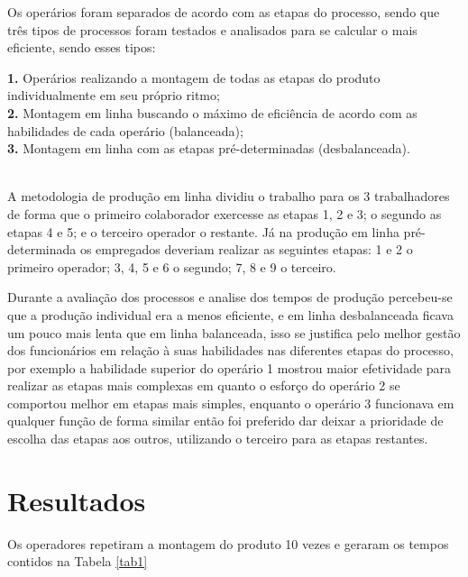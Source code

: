 \documentclass[
	12pt,				%
	oneside,			%
	a4paper,			%
	english,			%
	french,				%
	spanish,			%
	brazil,				%
	]{abntex2}
\begin{document}
Os operários foram separados de acordo com as etapas do processo, sendo que três tipos de processos foram testados e analisados para se calcular o mais eficiente, sendo esses tipos: \\


\begin{minipage}{13cm}
\begin{center}
\textbf{1.} Operários realizando a montagem de todas as etapas do produto individualmente em seu próprio ritmo;\\ 
\textbf{2.} Montagem em linha buscando o máximo de eficiência de acordo com as habilidades de cada operário (balanceada); \\
\textbf{3.} Montagem em linha com as etapas pré-determinadas (desbalanceada).
\end{center}
\end{minipage}\\

A metodologia de produção em linha dividiu o trabalho para os 3 trabalhadores de forma que o primeiro colaborador exercesse as etapas 1, 2 e 3; o segundo as etapas 4 e 5; e o terceiro operador o restante. Já na produção em linha pré-determinada os empregados deveriam realizar as seguintes etapas: 1 e 2 o primeiro operador; 3, 4, 5 e 6 o segundo; 7, 8 e 9 o terceiro.

Durante a avaliação dos processos e analise dos tempos de produção percebeu-se que a produção individual era a menos eficiente, e em linha desbalanceada ficava um pouco mais lenta que em linha balanceada, isso se justifica pelo melhor gestão dos funcionários em relação à suas habilidades nas diferentes etapas do processo, por exemplo a habilidade superior do operário 1 mostrou maior efetividade para realizar as etapas mais complexas em quanto o esforço do operário 2 se comportou melhor em etapas mais simples, enquanto o operário 3 funcionava em qualquer função de forma similar então foi preferido dar deixar a prioridade de escolha das etapas aos outros, utilizando o terceiro para as etapas restantes.


\newpage
\section[Resultados]{Resultados}
\pagestyle{fancy}

Os operadores repetiram a montagem do produto 10 vezes e geraram os tempos contidos na Tabela \ref{tab1}
\end{document}
